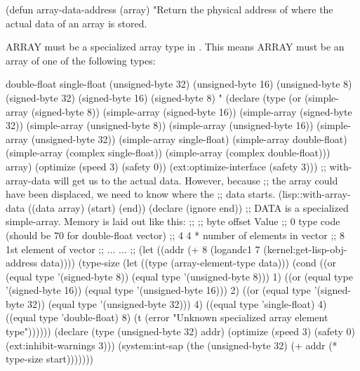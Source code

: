 \begin{example}
(defun array-data-address (array)
  "Return the physical address of where the actual data of an array is
stored.

ARRAY must be a specialized array type in \cmucl{}.  This means ARRAY
must be an array of one of the following types:

                  double-float
                  single-float
                  (unsigned-byte 32)
                  (unsigned-byte 16)
                  (unsigned-byte  8)
                  (signed-byte 32)
                  (signed-byte 16)
                  (signed-byte  8)
"
  (declare (type (or (simple-array (signed-byte 8))
                     (simple-array (signed-byte 16))
                     (simple-array (signed-byte 32))
                     (simple-array (unsigned-byte 8))
                     (simple-array (unsigned-byte 16))
                     (simple-array (unsigned-byte 32))
                     (simple-array single-float)
                     (simple-array double-float)
                     (simple-array (complex single-float))
                     (simple-array (complex double-float)))
                 array)
           (optimize (speed 3) (safety 0))
           (ext:optimize-interface (safety 3)))
  ;; with-array-data will get us to the actual data.  However, because
  ;; the array could have been displaced, we need to know where the
  ;; data starts.
  (lisp::with-array-data ((data array)
                          (start)
                          (end))
    (declare (ignore end))
    ;; DATA is a specialized simple-array.  Memory is laid out like this:
    ;;
    ;;   byte offset    Value
    ;;        0         type code (should be 70 for double-float vector)
    ;;        4         4 * number of elements in vector
    ;;        8         1st element of vector
    ;;      ...         ...
    ;;
    (let ((addr (+ 8 (logandc1 7 (kernel:get-lisp-obj-address data))))
          (type-size
           (let ((type (array-element-type data)))
             (cond ((or (equal type '(signed-byte 8))
                        (equal type '(unsigned-byte 8)))
                    1)
                   ((or (equal type '(signed-byte 16))
                        (equal type '(unsigned-byte 16)))
                    2)
                   ((or (equal type '(signed-byte 32))
                        (equal type '(unsigned-byte 32)))
                    4)
                   ((equal type 'single-float)
                    4)
                   ((equal type 'double-float)
                    8)
                   (t
                    (error "Unknown specialized array element type"))))))
      (declare (type (unsigned-byte 32) addr)
               (optimize (speed 3) (safety 0) (ext:inhibit-warnings 3)))
      (system:int-sap (the (unsigned-byte 32)
                        (+ addr (* type-size start)))))))
\end{example}

